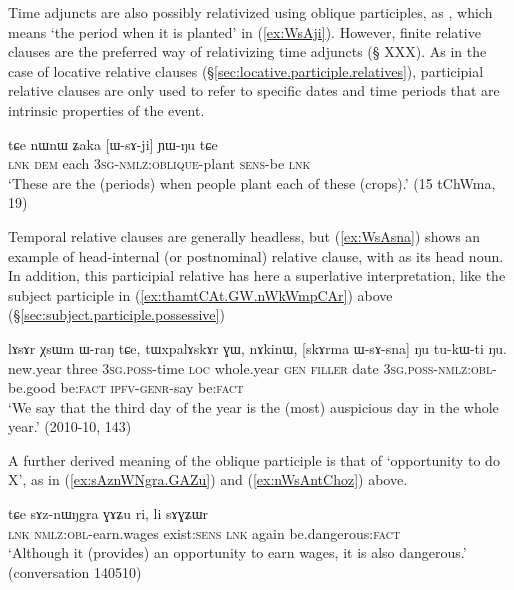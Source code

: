 Time adjuncts are also possibly relativized using oblique participles, as , which means `the period when it is planted' in (\ref{ex:WsAji}). However, finite relative clauses are the preferred way of relativizing time adjuncts (§ XXX). As in the case of locative relative clauses (§\ref{sec:locative.participle.relatives}), participial relative clauses are only used to refer to specific dates and time periods that are intrinsic properties of the event.

\begin{exe}
   \ex \label{ex:WsAji}
   \gll    tɕe nɯnɯ ʑaka [ɯ-sɤ-ji] ɲɯ-ŋu tɕe \\
   \textsc{lnk} \textsc{dem} each \textsc{3sg-nmlz:oblique}-plant \textsc{sens}-be \textsc{lnk}\\
\glt `These are the (periods) when people plant each of these (crops).' (15 tChWma, 19)
\end{exe}

Temporal relative clauses are generally headless, but (\ref{ex:WsAsna}) shows an example of head-internal (or postnominal) relative clause, with  as its head noun. In addition, this participial relative has here a superlative interpretation, like the subject participle in (\ref{ex:thamtCAt.GW.nWkWmpCAr}) above (§\ref{sec:subject.participle.possessive})

\begin{exe}
   \ex \label{ex:WsAsna}
   \gll    lɤsɤr χsɯm ɯ-raŋ tɕe, tɯxpalɤskɤr ɣɯ, nɤkinɯ, [skɤrma ɯ-sɤ-sna] ŋu tu-kɯ-ti ŋu. \\
   new.year three \textsc{3sg}.\textsc{poss}-time \textsc{loc} whole.year \textsc{gen} \textsc{filler} date \textsc{3sg}.\textsc{poss}-\textsc{nmlz}:\textsc{obl}-be.good be:\textsc{fact} \textsc{ipfv}-\textsc{genr}-say be:\textsc{fact} \\
\glt `We say that the third day of the year is the (most) auspicious day in the whole year.' (2010-10, 143)
\end{exe}

A further derived meaning of the oblique participle is that of `opportunity to do X', as in (\ref{ex:sAznWNgra.GAZu}) and (\ref{ex:nWsAntChoz}) above.

\begin{exe}
\ex \label{ex:sAznWNgra.GAZu}
\gll tɕe sɤz-nɯŋgra ɣɤʑu ri, li sɤɣʑɯr \\
\textsc{lnk} \textsc{nmlz}:\textsc{obl}-earn.wages exist:\textsc{sens} \textsc{lnk} again be.dangerous:\textsc{fact} \\
\glt `Although it (provides) an opportunity to earn wages, it is also dangerous.' (conversation 140510)
\end{exe}

